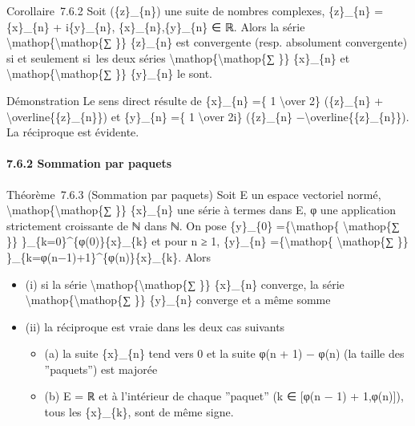 \documentclass[]{article}
\begin{document}
Corollaire~7.6.2 Soit (\{z\}\_\{n\}) une suite de nombres complexes,
\{z\}\_\{n\} = \{x\}\_\{n\} + i\{y\}\_\{n\}, \{x\}\_\{n\},\{y\}\_\{n\} ∈
ℝ. Alors la série \textbackslash{}mathop\{\textbackslash{}mathop\{∑ \}\}
\{z\}\_\{n\} est convergente (resp. absolument convergente) si et
seulement si~les deux séries
\textbackslash{}mathop\{\textbackslash{}mathop\{∑ \}\} \{x\}\_\{n\} et
\textbackslash{}mathop\{\textbackslash{}mathop\{∑ \}\} \{y\}\_\{n\} le
sont.

Démonstration Le sens direct résulte de \{x\}\_\{n\} =\{ 1
\textbackslash{}over 2\} (\{z\}\_\{n\} +
\textbackslash{}overline\{\{z\}\_\{n\}\}) et \{y\}\_\{n\} =\{ 1
\textbackslash{}over 2i\} (\{z\}\_\{n\}
−\textbackslash{}overline\{\{z\}\_\{n\}\}). La réciproque est évidente.

\paragraph{7.6.2 Sommation par paquets}

Théorème~7.6.3 (Sommation par paquets) Soit E un espace vectoriel normé,
\textbackslash{}mathop\{\textbackslash{}mathop\{∑ \}\} \{x\}\_\{n\} une
série à termes dans E, φ une application strictement croissante de ℕ
dans ℕ. On pose \{y\}\_\{0\} =\{\textbackslash{}mathop\{
\textbackslash{}mathop\{∑ \}\} \}\_\{k=0\}\^{}\{φ(0)\}\{x\}\_\{k\} et
pour n ≥ 1, \{y\}\_\{n\} =\{\textbackslash{}mathop\{
\textbackslash{}mathop\{∑ \}\}
\}\_\{k=φ(n−1)+1\}\^{}\{φ(n)\}\{x\}\_\{k\}. Alors

\begin{itemize}
\itemsep1pt\parskip0pt
\item
  (i) si la série \textbackslash{}mathop\{\textbackslash{}mathop\{∑ \}\}
  \{x\}\_\{n\} converge, la série
  \textbackslash{}mathop\{\textbackslash{}mathop\{∑ \}\} \{y\}\_\{n\}
  converge et a même somme
\item
  (ii) la réciproque est vraie dans les deux cas suivants

  \begin{itemize}
  \itemsep1pt\parskip0pt
  \item
    (a) la suite \{x\}\_\{n\} tend vers 0 et la suite φ(n + 1) − φ(n)
    (la taille des ''paquets'') est majorée
  \item
    (b) E = ℝ et à l'intérieur de chaque ''paquet'' (k ∈ {[}φ(n − 1) +
    1,φ(n){]}), tous les \{x\}\_\{k\}, sont de même signe.
  \end{itemize}
\end{itemize}
\end{document}
